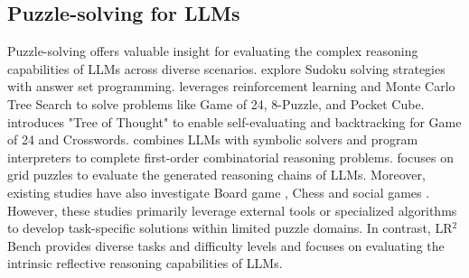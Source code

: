 \subsection{Puzzle-solving for LLMs}
Puzzle-solving \citep{giadikiaroglou2024puzzle} offers valuable insight for evaluating the complex reasoning capabilities of LLMs across diverse scenarios. \citet{ishay2023leveraging} explore Sudoku solving strategies with answer set programming. \citet{ding2023everything} leverages reinforcement learning and Monte Carlo Tree Search to solve problems like Game of 24, 8-Puzzle, and Pocket Cube. \citet{yao2024tree} introduces "Tree of Thought" to enable self-evaluating and backtracking for Game of 24 and Crosswords. \citet{mittal2024puzzlebench} combines LLMs with symbolic solvers and program interpreters to complete first-order combinatorial reasoning problems. \citet{tyagi2024step} focuses on grid puzzles to evaluate the generated reasoning chains of LLMs. Moreover, existing studies have also investigate Board game \citep{kazemi2024boardgameqa}, Chess \citep{feng2024chessgpt} and social games \citep{light2023avalonbench, wang2023avalon, xu2023exploring}. However, these studies primarily leverage external tools or specialized algorithms to develop task-specific solutions within limited puzzle domains. In contrast, LR$^2$Bench provides diverse tasks and difficulty levels and focuses on evaluating the intrinsic reflective reasoning capabilities of LLMs.